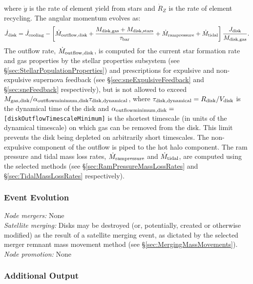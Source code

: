 where $\dot{y}$ is the rate of element yield from stars and $\dot{R}_Z$ is the rate of element recycling. The angular momentum evolves as:
\begin{equation}
 \dot{J}_{\rm disk} = \dot{J}_{\rm cooling} - \left[ \dot{M}_{\rm outflow, disk} + {M_{\rm disk, gas}  + M_{\rm disk, stars} \over \tau_{\rm bar}} + \dot{M}_{\rm ram pressure} + \dot{M}_{\rm tidal}\right] {J_{\rm disk} \over M_{\rm disk, gas}}.
\end{equation}
The outflow rate, $\dot{M}_{\rm outflow, disk}$, is computed for the current star formation rate and gas properties by the stellar properties subsystem (see \S\ref{sec:StellarPopulationProperties}) and prescriptions for expulsive and non-expulsive supernova feedback (see \S\ref{sec:sneExpulsiveFeedback} and \S\ref{sec:sneFeedback} respectively), but is not allowed to exceed $M_{\rm gas, disk}/ \alpha_{\rm outflow minimum, disk} \tau_{\rm disk, dynamical}$, where $\tau_{\rm disk, dynamical}=R_{\rm disk}/V_{\rm disk}$ is the dynamical time of the disk and $\alpha_{\rm outflow minimum, disk}=${\tt [diskOutflowTimescaleMinimum]} is the shortest timescale (in units of the dynamical timescale) on which gas can be removed from the disk. This limit prevents the disk being depleted on arbitrarily short timescales. The non-expulsive \gls{component} of the outflow is piped to the hot halo component.  The ram pressure and tidal mass loss rates, $\dot{M}_{\rm ram pressure}$ and $\dot{M}_{\rm tidal}$, are computed using the selected methods (see \S\ref{sec:RamPressureMassLossRates} and \S\ref{sec:TidalMassLossRates} respectively).

\subsubsection{Event Evolution}

\noindent\emph{Node mergers:} None\\

\noindent\emph{Satellite merging:} Disks may be destroyed (or, potentially, created or otherwise modified) as the result of a satellite merging event, as dictated by the selected merger remnant mass movement method (see \S\ref{sec:MergingMassMovements}).\\

\noindent\emph{Node promotion:} None\\

\subsubsection{Additional Output}

